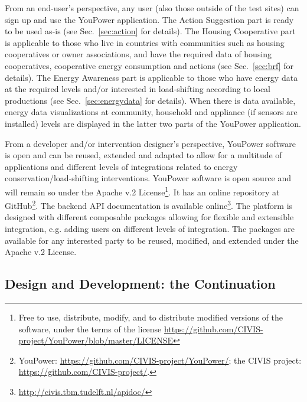 From an end-user's perspective, any user (also those outside of the test sites) can sign up and use the YouPower application. 
The Action Suggestion part is ready to be used as-is (see Sec.~\ref{sec:action} for details). The Housing Cooperative part is applicable to those who live in countries with communities such as housing cooperatives or owner associations, and have the required data of housing cooperatives, cooperative energy consumption and actions (see Sec.~\ref{sec:brf} for details). The Energy Awareness part is applicable to those who have energy data at the required levels and/or interested in load-shifting according to local productions (see Sec.~\ref{sec:energydata} for details). When there is data available, energy data visualizations at community, household and appliance (if sensors are installed) levels are displayed in the latter two parts of the YouPower application. 

From a developer and/or intervention designer's perspective, YouPower software is open and can be reused, extended and adapted to allow for a multitude of applications and different levels of integrations related to energy conservation/load-shifting interventions. 
YouPower software is open source and will remain so under the Apache v.2 License\footnote{Free to use, distribute, modify, and to distribute modified versions of the software, under the terms of the license  \url{https://github.com/CIVIS-project/YouPower/blob/master/LICENSE}}. It has  an online repository at GitHub\footnote{YouPower: \url{https://github.com/CIVIS-project/YouPower/}; the CIVIS project: \url{https://github.com/CIVIS-project/}.}. 
The backend API documentation is available online\footnote{\url{http://civis.tbm.tudelft.nl/apidoc/}}. 
% 
The platform is designed with different composable packages allowing for flexible and extensible integration, e.g. adding users on different levels of integration. The packages are available for any interested party to be reused, modified, and extended under the Apache v.2 License. 






\subsection{Design and Development: the Continuation}

